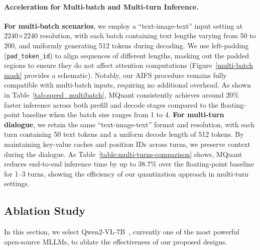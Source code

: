 \paragraph{Acceleration for Multi-batch and Multi-turn Inference.}
\textbf{\raisebox{-0.5pt}{\ding[1.1]{182\relax}} For multi-batch scenarios}, we employ a “text-image-text” input setting at 2240$\times$2240 resolution, with each batch containing text lengths varying from 50 to 200, and uniformly generating 512 tokens during decoding. We use left-padding (\texttt{pad\_token\_id}) to align sequences of different lengths, masking out the padded regions to ensure they do not affect attention computations (Figure~\ref{multi-batch mask} provides a schematic). Notably, our AIFS procedure remains fully compatible with multi-batch inputs, requiring no additional overhead. As shown in Table~\ref{tab:speed_multibatch}, MQuant consistently achieves around 20\% faster inference across both prefill and decode stages compared to the floating-point baseline when the batch size ranges from 1 to 4. \textbf{\raisebox{-0.5pt}{\ding[1.1]{183\relax}} For multi-turn dialogue}, we retain the same “text-image-text” format and resolution, with each turn containing 50 text tokens and a uniform decode length of 512 tokens. By maintaining key-value caches and position IDs across turns, we preserve context during the dialogue. As Table~\ref{table:multi-turns-comparison} shows, MQuant reduces end-to-end inference time by up to 38.7\% over the floating-point baseline for 1--3 turns, showing the efficiency of our quantization approach in multi-turn settings.

\vspace{-3.5mm}
\subsection{Ablation Study}
\vspace{-2mm}
In this section, we select Qwen2-VL-7B~\citep{Qwen2VL}, currently one of the most powerful open-source MLLMs, to ablate the effectiveness of our proposed designs.

